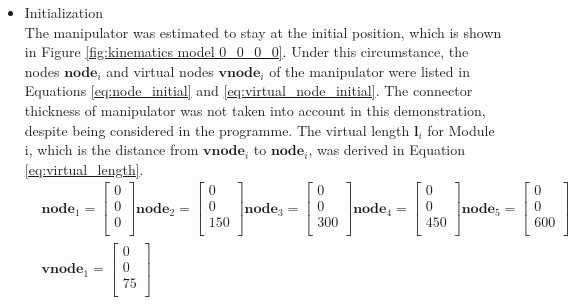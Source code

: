 \begin{itemize}
    \item Initialization \\
    The manipulator was estimated to stay at the initial position, which is shown in Figure 
    \ref{fig:kinematics model 0_0_0_0}. Under this circumstance, the nodes $\textbf{node}_{i}$ and 
    virtual nodes $\textbf{vnode}_{i}$ of the manipulator were listed in Equations \ref{eq:node_initial} and 
    \ref{eq:virtual_node_initial}. The connector thickness of manipulator was not taken into account in this 
    demonstration, despite being considered in the programme. The virtual length $\textbf{l}_{i}$ for Module i, which 
    is the distance from $\textbf{vnode}_{i}$ to $\textbf{node}_{i}$, was derived in Equation \ref{eq:virtual_length}.
    \vspace{-5mm}
    \begin{align}
        & \textbf{node}_{1} = \begin{bmatrix} 0 \\ 0 \\ 0 \\ \end{bmatrix} 
        \textbf{node}_{2} = \begin{bmatrix} 0 \\ 0 \\ 150 \\ \end{bmatrix} 
        \textbf{node}_{3} = \begin{bmatrix} 0 \\ 0 \\ 300 \\ \end{bmatrix} 
        \textbf{node}_{4} = \begin{bmatrix} 0 \\ 0 \\ 450 \\ \end{bmatrix} 
        \textbf{node}_{5} = \begin{bmatrix} 0 \\ 0 \\ 600 \\ \end{bmatrix} 
        \label{eq:node_initial} \\
        &\textbf{vnode}_{1} = \begin{bmatrix} 0 \\ 0 \\ 75 \\ \end{bmatrix} 

\end{align}
\end{itemize}
